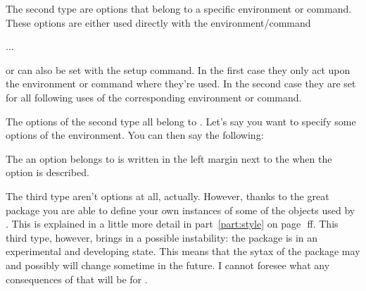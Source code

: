\documentclass[load-preamble+]{cnltx-doc}
\begin{document}
The second type are options that belong to a specific environment or command.
These options are either used directly with the environment/command
\begin{sourcecode}
  \begin{env}[<options>]
   ...
  \end{env}
\end{sourcecode}
or can also be set with the setup command.  In the first case they only act
upon the environment or command where they're used.  In the second case they
are set for all following uses of the corresponding environment or command.

The options of the second type all belong to .  Let's say you
want to specify some options of the  environment.  You can then
say the following:
\begin{sourcecode}
\end{sourcecode}
The  an option belongs to is written in the left margin next
to the when the option is described.

The third type aren't options at all, actually.  However, thanks to the great
 package you are able to define your own instances of some of
the objects used by \ExSheets.  This is explained in a little more detail in
part~\ref{part:style} on page~\pageref{part:style}\,ff.  This third type,
however, brings in a possible instability: the  package is in
an experimental and developing state.  This means that the sytax of the
package may and possibly will change sometime in the future.  I cannot foresee
what any consequences of that will be for \ExSheets.
\end{document}
